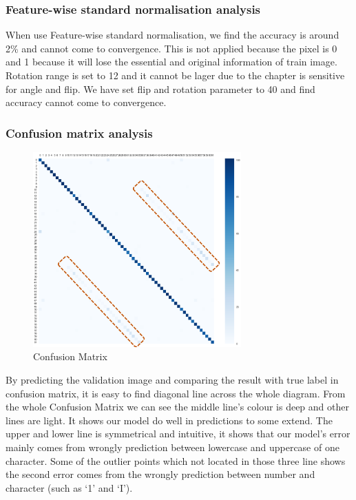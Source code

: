 \documentclass[twoside,twocolumn,10.8pt]{article}
\begin{document}
\subsubsection{Feature-wise standard normalisation analysis}
When use Feature-wise standard normalisation, we find the accuracy is around 2\% and cannot come to convergence. This is not applied because the pixel is 0 and 1 because it will lose the essential and original information of train image. Rotation range is set to 12 and it cannot be lager due to the chapter is sensitive for angle and flip. We have set flip and rotation parameter to 40 and find accuracy cannot come to convergence. 


\subsubsection{Confusion matrix analysis}

\begin{figure}[h]
\includegraphics[width=8cm]{confusion_matrix.png}
\centering
\caption{Confusion Matrix}\label{fig3}
\end{figure}

\noindent By predicting the validation image and comparing the result with true label in confusion matrix, it is easy to find diagonal line across the whole diagram. From the whole Confusion Matrix we can see the middle line’s colour is deep and other lines are light. It shows our model do well in predictions to some extend. The upper and lower line is symmetrical and intuitive, it shows that our model’s error mainly comes from wrongly prediction between lowercase and uppercase of one character. Some of the outlier points which not located in those three line shows the second error comes from the wrongly prediction between number and character (such as ‘1’ and ‘I’).
\end{document}
